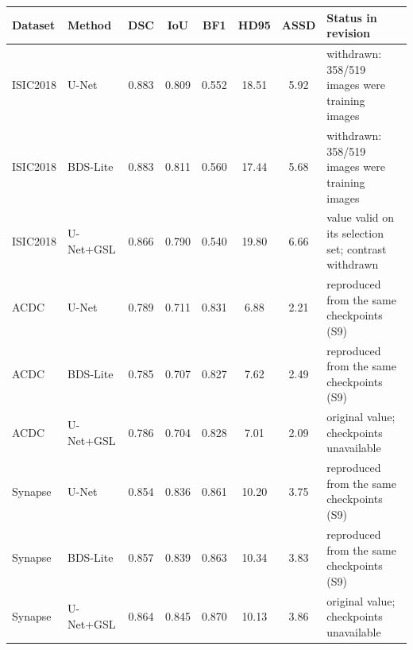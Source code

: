 \begin{tabular}{llcccccl}
\toprule
Dataset & Method & DSC & IoU & BF1 & HD95 & ASSD & Status in revision \\
\midrule
ISIC2018 & U-Net & 0.883 & 0.809 & 0.552 & 18.51 & 5.92 & withdrawn: 358/519 images were training images \\
ISIC2018 & BDS-Lite & 0.883 & 0.811 & 0.560 & 17.44 & 5.68 & withdrawn: 358/519 images were training images \\
ISIC2018 & U-Net+GSL & 0.866 & 0.790 & 0.540 & 19.80 & 6.66 & value valid on its selection set; contrast withdrawn \\
ACDC & U-Net & 0.789 & 0.711 & 0.831 & 6.88 & 2.21 & reproduced from the same checkpoints (S9) \\
ACDC & BDS-Lite & 0.785 & 0.707 & 0.827 & 7.62 & 2.49 & reproduced from the same checkpoints (S9) \\
ACDC & U-Net+GSL & 0.786 & 0.704 & 0.828 & 7.01 & 2.09 & original value; checkpoints unavailable \\
Synapse & U-Net & 0.854 & 0.836 & 0.861 & 10.20 & 3.75 & reproduced from the same checkpoints (S9) \\
Synapse & BDS-Lite & 0.857 & 0.839 & 0.863 & 10.34 & 3.83 & reproduced from the same checkpoints (S9) \\
Synapse & U-Net+GSL & 0.864 & 0.845 & 0.870 & 10.13 & 3.86 & original value; checkpoints unavailable \\
\bottomrule
\end{tabular}
